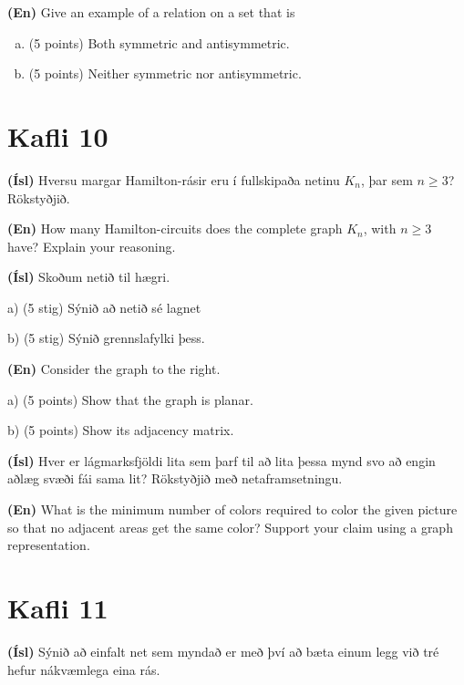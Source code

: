 \documentclass[addpoints]{exam}
\begin{document}
\begin{questions}

\textbf{(En)} Give an example of a relation on a set that is
\begin{enumerate}[(a)]
 \item (5 points) Both symmetric and antisymmetric.
 \item (5 points) Neither symmetric nor antisymmetric.
\end{enumerate}

\section{Kafli 10}

\question[10] 

\textbf{(Ísl)} Hversu margar Hamilton-rásir eru í fullskipaða netinu $K_n$, þar sem $n \geq 3$? Rökstyðjið.

\textbf{(En)} How many Hamilton-circuits does the complete graph $K_n$, with $n \geq 3$ have? Explain your reasoning.

\question[10]
\begin{multicols}{2}
\textbf{(Ísl)} Skoðum netið til hægri.

{a) (5 stig)} Sýnið að netið sé lagnet

{b) (5 stig)} Sýnið grennslafylki þess.

\textbf{(En)} Consider the graph to the right.

{a) (5 points)} Show that the graph is planar.

{b) (5 points)} Show its adjacency matrix.

\begin{center}
\end{center}

\end{multicols}

\question[10] \textbf{(Ísl)} Hver er lágmarksfjöldi lita sem þarf til að lita þessa mynd svo að engin aðlæg svæði fái sama lit? Rökstyðjið með netaframsetningu.

\textbf{(En)} What is the minimum number of colors required to color the given picture so that no adjacent areas get the same color? Support your claim using a graph representation.

\section{Kafli 11}
\question[10] \textbf{(Ísl)} Sýnið að einfalt net sem myndað er með því að bæta einum legg við tré hefur nákvæmlega eina rás.


\end{questions}
\end{document}
